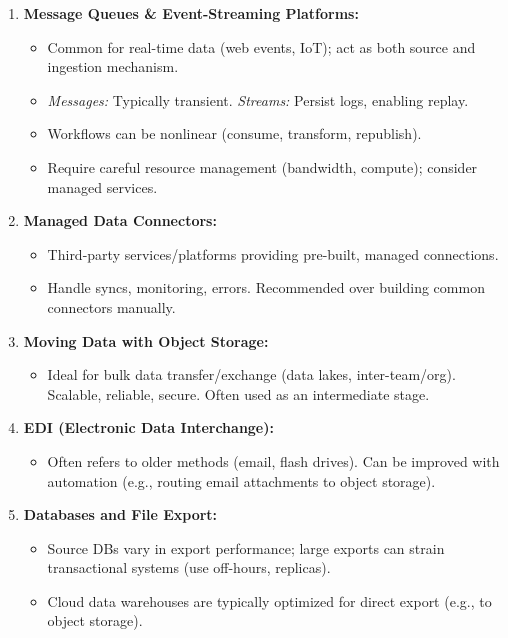 \begin{enumerate}
    \item \textbf{Message Queues \& Event-Streaming Platforms:}
    \begin{itemize}[label=\textbullet]
        \item Common for real-time data (web events, IoT); act as both source and ingestion mechanism.
        \item \textit{Messages:} Typically transient. \textit{Streams:} Persist logs, enabling replay.
        \item Workflows can be nonlinear (consume, transform, republish).
        \item Require careful resource management (bandwidth, compute); consider managed services.
    \end{itemize}

    \item \textbf{Managed Data Connectors:}
    \begin{itemize}[label=\textbullet]
        \item Third-party services/platforms providing pre-built, managed connections.
        \item Handle syncs, monitoring, errors. Recommended over building common connectors manually.
    \end{itemize}

    \item \textbf{Moving Data with Object Storage:}
    \begin{itemize}[label=\textbullet]
        \item Ideal for bulk data transfer/exchange (data lakes, inter-team/org). Scalable, reliable, secure. Often used as an intermediate stage.
    \end{itemize}

    \item \textbf{EDI (Electronic Data Interchange):}
    \begin{itemize}[label=\textbullet]
        \item Often refers to older methods (email, flash drives). Can be improved with automation (e.g., routing email attachments to object storage).
    \end{itemize}

    \item \textbf{Databases and File Export:}
    \begin{itemize}[label=\textbullet]
        \item Source DBs vary in export performance; large exports can strain transactional systems (use off-hours, replicas).
        \item Cloud data warehouses are typically optimized for direct export (e.g., to object storage).
    \end{itemize}


\end{enumerate}
